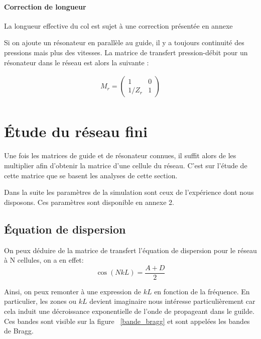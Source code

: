 \paragraph{Correction de longueur}
La longueur effective du col est sujet à une correction présentée en annexe 

Si on ajoute un résonateur en parallèle au guide, il y a toujours continuité des pressions mais plus des vitesses. La matrice de transfert pression-débit pour un résonateur dans le réseau est alors la suivante :

\begin{eqnarray*}
M_{r} = \begin{pmatrix} 1 &  0 \\ 1 /Z_{r} & 1  \end{pmatrix}\\
\end{eqnarray*}

\section{Étude du réseau fini}

Une fois les matrices de guide et de résonateur connues, il suffit alors de les multiplier afin d'obtenir la matrice d'une cellule du réseau. C'est sur l'étude de cette matrice que se basent les analyses de cette section. 

Dans la suite les paramètres de la simulation sont ceux de l'expérience dont nous disposons. Ces paramètres sont disponible en annexe 2.

\subsection{Équation de dispersion}
On peux déduire de la matrice de transfert l'équation de dispersion pour le réseau à N cellules, on a en effet:
\begin{equation}
\cos(NkL) = \frac{A+D}{2} 
\end{equation}

Ainsi, on peux remonter à une expression de $kL$ en fonction de la fréquence. En particulier, les zones ou $kL$ devient imaginaire nous intéresse particulièrement car cela induit une décroissance exponentielle de l'onde de propageant dans le guilde. Ces bandes sont visible sur la figure ~\ref{bande_bragg} et sont appelées les bandes de Bragg.



